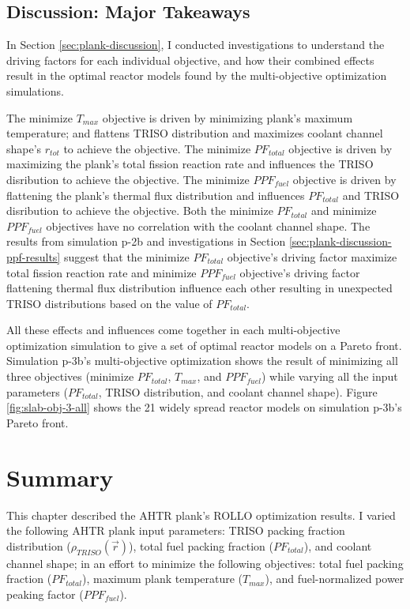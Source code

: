 \subsection{Discussion: Major Takeaways}
In Section \ref{sec:plank-discussion}, I conducted investigations to understand the 
driving factors for each individual objective, and how their combined effects 
result in the optimal reactor models found by the multi-objective optimization 
simulations. 

The minimize $T_{max}$ objective is driven by minimizing plank's maximum temperature; 
and flattens TRISO distribution and maximizes coolant channel shape's $r_{tot}$ to 
achieve the objective. 
The minimize $PF_{total}$ objective is driven by maximizing the plank's total fission 
reaction rate and influences the TRISO disribution to achieve the objective. 
The minimize $PPF_{fuel}$ objective is driven by flattening the plank's thermal flux
distribution and influences $PF_{total}$ and TRISO disribution to achieve the objective. 
Both the minimize $PF_{total}$ and minimize $PPF_{fuel}$ objectives have no correlation 
with the coolant channel shape. 
The results from simulation p-2b and investigations in Section 
\ref{sec:plank-discussion-ppf-results} suggest that the minimize $PF_{total}$ 
objective's driving factor maximize total fission reaction rate and 
minimize $PPF_{fuel}$ objective's driving factor flattening thermal flux distribution 
influence each other resulting in unexpected TRISO distributions based 
on the value of $PF_{total}$. 

All these effects and influences come together in each multi-objective optimization 
simulation to give a set of optimal reactor models on a Pareto front. 
Simulation p-3b's multi-objective optimization shows the result of minimizing all 
three objectives (minimize $PF_{total}$, $T_{max}$, and $PPF_{fuel}$) while varying 
all the input parameters ($PF_{total}$, TRISO distribution, and coolant channel shape).
Figure \ref{fig:slab-obj-3-all} shows the 21 widely spread reactor models on simulation 
p-3b's Pareto front. 

\pagebreak
\section{Summary}
\glsresetall
This chapter described the \gls{AHTR} plank's \gls{ROLLO} optimization results. 
I varied the following \gls{AHTR} plank input parameters: \gls{TRISO} packing fraction 
distribution ($\rho_{TRISO}(\vec{r})$), total fuel packing fraction ($PF_{total}$), and 
coolant channel shape; in an effort to minimize the following objectives: total 
fuel packing fraction ($PF_{total}$), maximum plank temperature ($T_{max}$), and 
fuel-normalized power peaking factor ($PPF_{fuel}$). 

